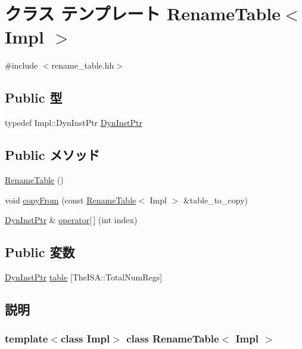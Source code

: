 \hypertarget{classRenameTable}{
\section{クラス テンプレート RenameTable$<$ Impl $>$}
\label{classRenameTable}
}


{\ttfamily \#include $<$rename\_\-table.hh$>$}\subsection*{Public 型}
\begin{DoxyCompactItemize}
\item 
typedef Impl::DynInstPtr \hyperlink{classRenameTable_a028ce10889c5f6450239d9e9a7347976}{DynInstPtr}
\end{DoxyCompactItemize}
\subsection*{Public メソッド}
\begin{DoxyCompactItemize}
\item 
\hyperlink{classRenameTable_a01ad4b6bd6eae3d2962be56e3ac11273}{RenameTable} ()
\item 
void \hyperlink{classRenameTable_af3b6a44848d0b403df2362b4ea58c41e}{copyFrom} (const \hyperlink{classRenameTable}{RenameTable}$<$ Impl $>$ \&table\_\-to\_\-copy)
\item 
\hyperlink{classRenameTable_a028ce10889c5f6450239d9e9a7347976}{DynInstPtr} \& \hyperlink{classRenameTable_aa4cb687631002d5fbca515c41b099588}{operator\mbox{[}$\,$\mbox{]}} (int index)
\end{DoxyCompactItemize}
\subsection*{Public 変数}
\begin{DoxyCompactItemize}
\item 
\hyperlink{classRenameTable_a028ce10889c5f6450239d9e9a7347976}{DynInstPtr} \hyperlink{classRenameTable_a35fd4e9d1b3d87751243fab1a88f8959}{table} \mbox{[}TheISA::TotalNumRegs\mbox{]}
\end{DoxyCompactItemize}


\subsection{説明}
\subsubsection*{template$<$class Impl$>$ class RenameTable$<$ Impl $>$}

